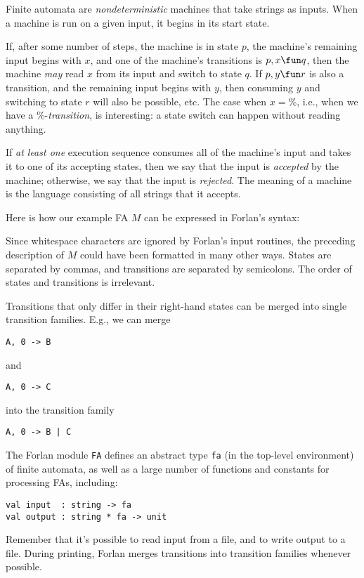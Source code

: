 Finite automata are \emph{nondeterministic} machines that take strings as
inputs.  When a machine is run on a given input, it begins in
its start state.

If, after some number of steps, the machine is in state $p$, the
machine's remaining input begins with $x$, and one of the machine's
transitions is $p,x\fun q$, then the machine \emph{may} read $x$ from
its input and switch to state $q$.  If $p, y\fun r$ is also a
transition, and the remaining input begins with $y$, then consuming
$y$ and switching to state $r$ will also be possible, etc.  The case
when $x=\%$, i.e., when we have a $\%$-\emph{transition}, is
interesting: a state switch can happen without reading anything.

If \emph{at least one} execution sequence consumes all of the machine's input
and takes it to one of its accepting states, then we say that the
input is \emph{accepted} by the machine; otherwise, we say that the
input is \emph{rejected}.  The meaning of a machine is the language
consisting of all strings that it accepts.

Here is how our example FA $M$ can be expressed in Forlan's syntax:

Since whitespace characters are ignored by Forlan's input routines,
the preceding description of $M$ could have been formatted in many other
ways.  States are separated by commas, and transitions are separated
by semicolons.  The order of states and transitions is irrelevant.

Transitions that only differ in their right-hand states can be
merged into single transition families.  E.g., we can merge
\begin{verbatim}
A, 0 -> B
\end{verbatim}
and
\begin{verbatim}
A, 0 -> C
\end{verbatim}
into the transition family
\begin{verbatim}
A, 0 -> B | C
\end{verbatim}

The Forlan module \texttt{FA} defines an abstract type \texttt{fa} (in
the top-level environment) of finite automata, as well as a large
number of functions and constants for processing FAs, including:
\begin{verbatim}
val input  : string -> fa
val output : string * fa -> unit 
\end{verbatim}

Remember that it's possible to read input from a file, and to write
output to a file.  During printing, Forlan merges transitions into
transition families whenever possible.

